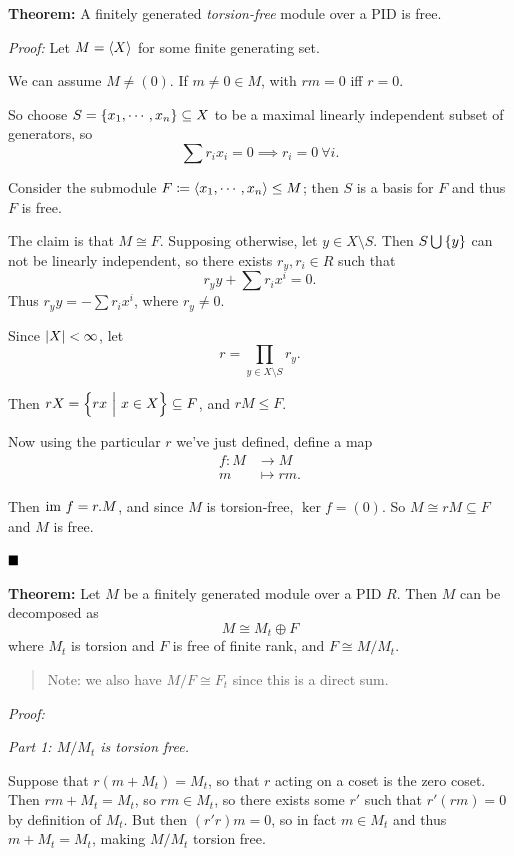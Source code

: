 \textbf{Theorem:} A finitely generated \emph{torsion-free} module over a
PID is free.

\emph{Proof:} Let \(M = \left\langle{X}\right\rangle\) for some finite generating set.

We can assume \(M \neq (0)\). If \(m\neq 0 \in M\), with \(rm = 0\) iff
\(r=0\).

So choose \(S = \left\{{x_1, \cdots , x_n}\right\} \subseteq X\) to be a maximal
linearly independent subset of generators, so \[
\sum r_i x_i = 0 \implies r_i = 0 ~\forall i
.\]

Consider the submodule
\(F \coloneqq \left\langle{x_1, \cdots, x_n}\right\rangle \leq M\); then \(S\) is a
basis for \(F\) and thus \(F\) is free.

The claim is that \(M \cong F\). Supposing otherwise, let
\(y\in X\setminus S\). Then \(S \bigcup \left\{{y}\right\}\) can not be linearly
independent, so there exists \(r_y, r_i \in R\) such that \[
r_y y + \sum r_i x^i = 0
.\] Thus \(r_y y = - \sum r_i x^i\), where \(r_y \neq 0\).

Since \({\left\lvert {X} \right\rvert} < \infty\), let \[
r = \prod_{y \in X\setminus S} r_y
.\]

Then \(rX = \left\{{rx {~\mathrel{\Big|}~} x\in X}\right\} \subseteq F\), and
\(rM \leq F\).

Now using the particular \(r\) we've just defined, define a map
\begin{align*}
f: M &\to M \\
m &\mapsto rm
.\end{align*}

Then \({\text{im}~} f = r.M\), and since \(M\) is torsion-free, \(\ker f = (0)\).
So \(M \cong rM \subseteq F\) and \(M\) is free.

\(\qed\)

\textbf{Theorem:} Let \(M\) be a finitely generated module over a PID
\(R\). Then \(M\) can be decomposed as \[
M \cong M_t \oplus F
\] where \(M_t\) is torsion and \(F\) is free of finite rank, and
\(F \cong M/M_t\).

\begin{quote}
Note: we also have \(M/F \cong F_t\) since this is a direct sum.
\end{quote}

\emph{Proof:}

\emph{Part 1: \(M/M_t\) is torsion free.}

Suppose that \(r(m + M_t) = M_t\), so that \(r\) acting on a coset is
the zero coset. Then \(rm + M_t = M_t\), so \(rm \in M_t\), so there
exists some \(r'\) such that \(r'(rm) = 0\) by definition of \(M_t\).
But then \((r'r)m = 0\), so in fact \(m\in M_t\) and thus
\(m + M_t = M_t\), making \(M/M_t\) torsion free.


